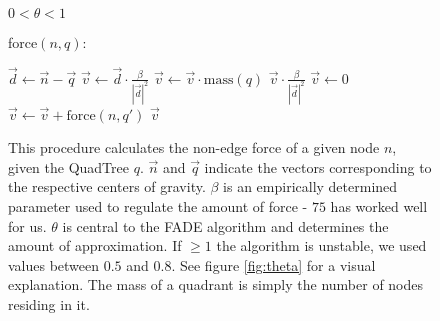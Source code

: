 \documentclass[a4paper,11pt,titlepage]{article}
\begin{document}
\begin{figure}[ht]
  \begin{minipage}[b]{0.5\linewidth}
    \begin{algorithmic}
      \REQUIRE $0 < \theta < 1$
    \end{algorithmic}
    force$(n, q)$:
    \begin{algorithmic}
      \STATE $\vec{d} \gets \vec{n} - \vec{q}$
      \STATE $\vec{v} \gets \vec{d} \cdot \frac{\beta}{|{\vec{d}}|^2}$
      \STATE $\vec{v} \gets \vec{v} \cdot \textrm{mass}(q)$
      \RETURN $\vec{v} \cdot \frac{\beta}{|{\vec{d}}|^2}$
      \ELSE
      \STATE $\vec{v} \gets 0$
      \STATE $\vec{v} \gets \vec{v} + \textrm{force}(n, q')$
      \ENDFOR
      \RETURN $\vec{v}$
      \ENDIF
    \end{algorithmic}
    \caption{This procedure calculates the non-edge force of a given node $n$, given the
      QuadTree $q$. $\vec{n}$ and $\vec{q}$ indicate the vectors corresponding to the
      respective centers of gravity. $\beta$ is an empirically determined parameter used
      to regulate the amount of force - $75$ has worked well for us. $\theta$ is central
      to the FADE algorithm and determines the amount of approximation. If $\geq 1$ the
      algorithm is unstable, we used values between $0.5$ and $0.8$. See figure
      \ref{fig:theta} for a visual explanation. The mass of a quadrant is simply the
      number of nodes residing in it. }
    \label{proc:FADE}
  \end{minipage}
  \hspace{10pt}
  \begin{minipage}[b]{0.5\linewidth}
    \centering
\end{minipage}
\end{figure}
\end{document}
